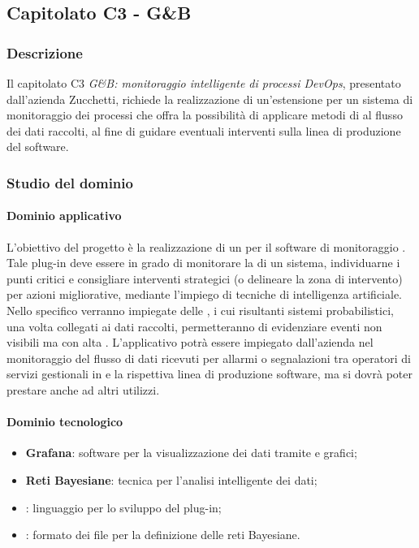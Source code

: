 	\subsection{Capitolato C3 - G\&B}
	
	\subsubsection{Descrizione}
	Il capitolato C3 \emph{G\&B: monitoraggio intelligente di processi DevOps}, presentato dall'azienda Zucchetti, richiede la realizzazione di un'estensione per un sistema di monitoraggio dei processi  che offra la possibilità di applicare metodi di  al flusso dei dati raccolti, al fine di guidare eventuali interventi sulla linea di produzione del software.
	
	\subsubsection{Studio del dominio}
	\paragraph{Dominio applicativo} \Spazio 
	L'obiettivo del progetto è la realizzazione di un  per il software di monitoraggio . Tale plug-in deve essere in grado di monitorare la  di un sistema, individuarne i punti critici e consigliare interventi strategici (o delineare la zona di intervento) per azioni migliorative, mediante l'impiego di tecniche di intelligenza artificiale. Nello specifico verranno impiegate delle , i cui risultanti sistemi probabilistici, una volta collegati ai dati raccolti, permetteranno di evidenziare eventi non visibili ma con alta . L'applicativo potrà essere impiegato dall'azienda nel monitoraggio del flusso di dati ricevuti per allarmi o segnalazioni tra operatori di servizi gestionali in  e la rispettiva linea di produzione software, ma si dovrà poter prestare anche ad altri utilizzi.
	\paragraph{Dominio tecnologico}
	\begin{itemize}
		\item\textbf{{Grafana}}: software per la visualizzazione dei dati tramite  e grafici;
		\item\textbf{{Reti Bayesiane}}: tecnica per l'analisi intelligente dei dati;
		\item\textbf{{}}: linguaggio per lo sviluppo del plug-in;
		\item\textbf{{}}: formato dei file per la definizione delle reti Bayesiane.
	\end{itemize}
	
